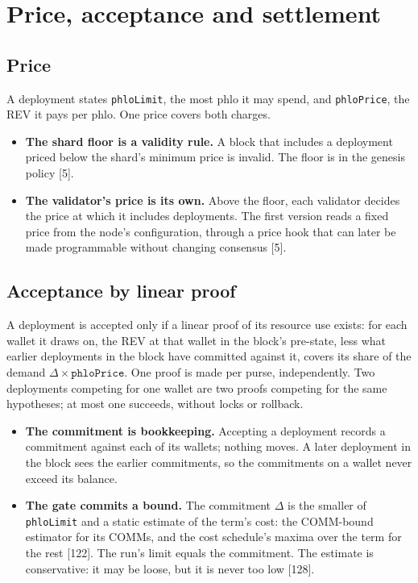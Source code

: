\documentclass[10.5pt]{article}
\newcommand{\code}[1]{\texttt{#1}}
\newcommand{\D}[1]{{\color{muted}\small[#1]}}
\begin{document}
\section{Price, acceptance and settlement}\label{sec:price}

\subsection{Price}

A deployment states \code{phloLimit}, the most phlo it may spend, and \code{phloPrice}, the REV it pays per phlo. One price covers both charges.
\begin{itemize}
\item \textbf{The shard floor is a validity rule.} A block that includes a deployment priced below the shard's minimum price is invalid. The floor is in the genesis policy \D{5}.
\item \textbf{The validator's price is its own.} Above the floor, each validator decides the price at which it includes deployments. The first version reads a fixed price from the node's configuration, through a price hook that can later be made programmable without changing consensus \D{5}.
\end{itemize}

\subsection{Acceptance by linear proof}

A deployment is accepted only if a linear proof of its resource use exists: for each wallet it draws on, the REV at that wallet in the block's pre-state, less what earlier deployments in the block have committed against it, covers its share of the demand $\Delta \times \code{phloPrice}$. One proof is made per purse, independently. Two deployments competing for one wallet are two proofs competing for the same hypotheses; at most one succeeds, without locks or rollback.

\begin{itemize}
\item \textbf{The commitment is bookkeeping.} Accepting a deployment records a commitment against each of its wallets; nothing moves. A later deployment in the block sees the earlier commitments, so the commitments on a wallet never exceed its balance.
\item \textbf{The gate commits a bound.} The commitment $\Delta$ is the smaller of \code{phloLimit} and a static estimate of the term's cost: the COMM-bound estimator for its COMMs, and the cost schedule's maxima over the term for the rest \D{122}. The run's limit equals the commitment. The estimate is conservative: it may be loose, but it is never too low \D{128}.
\end{itemize}
\end{document}
